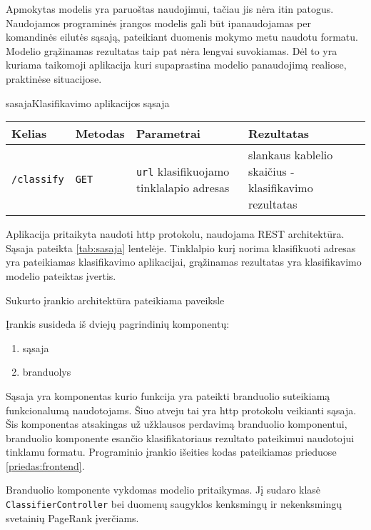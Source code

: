 
Apmokytas modelis yra paruoštas naudojimui, tačiau jis nėra itin patogus. Naudojamos programinės įrangos modelis gali būt ipanaudojamas per komandinės eilutės sąsają, pateikiant duomenis mokymo metu naudotu formatu. Modelio grąžinamas rezultatas taip pat nėra lengvai suvokiamas. Dėl to yra kuriama taikomoji aplikacija kuri supaprastina modelio panaudojimą realiose, praktinėse situacijose.

\begin{ktutable}{sasaja}{Klasifikavimo aplikacijos sąsaja}
    \begin{tabular}{|l|l|p{5cm}|p{5cm}|}
    \hline
        Kelias & Metodas & Parametrai & Rezultatas \\ \hline
        \texttt{/classify} & \texttt{GET} & \texttt{url} klasifikuojamo tinklalapio adresas & slankaus kablelio skaičius - klasifikavimo rezultatas \\ \hline
    \end{tabular}
\end{ktutable}

Aplikacija pritaikyta naudoti http protokolu, naudojama REST architektūra. Sąsaja pateikta \vref{tab:sasaja} lentelėje. Tinklalpio kurį norima klasifikuoti adresas yra pateikiamas klasifikavimo aplikacijai, grąžinamas rezultatas yra klasifikavimo modelio pateiktas įvertis.

Sukurto įrankio architektūra pateikiama paveiksle 


Įrankis susideda iš dviejų pagrindinių komponentų:
\begin{enumerate}
\item sąsaja
\item branduolys
\end{enumerate}
Sąsaja yra komponentas kurio funkcija yra pateikti branduolio suteikiamą funkcionalumą naudotojams. Šiuo atveju tai yra http protokolu veikianti sąsaja. Šis komponentas atsakingas už užklausos perdavimą branduolio komponentui, branduolio komponente esančio klasifikatoriaus rezultato pateikimui naudotojui tinklamu formatu. Programinio įrankio išeities kodas pateikiamas prieduose \vref{priedas:frontend}.

Branduolio komponente vykdomas modelio pritaikymas. Jį sudaro klasė \texttt{ClassifierController} bei duomenų saugyklos kenksmingų ir nekenksmingų svetainių PageRank įverčiams.

